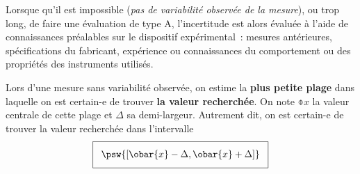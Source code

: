 \documentclass[../../main/main.tex]{subfiles}
\begin{document}
Lorsque qu'il est impossible (\textit{pas de variabilité observée de la
	mesure}), ou trop long, de faire une évaluation de type A, l'incertitude est
alors évaluée à l'aide de connaissances préalables sur le dispositif
expérimental~: mesures antérieures, spécifications du fabricant, expérience ou
connaissances du comportement ou des propriétés des instruments utilisés.
\bigbreak
\noindent
\begin{minipage}[c]{.55\linewidth}
	Lors d’une mesure sans variabilité observée, on estime la \textbf{plus petite
		plage} dans laquelle on est certain-e de trouver \textbf{la valeur recherchée}.
	On note $\obar{x}$ la valeur centrale de cette plage et $\Delta$ sa
	demi-largeur.
	\smallbreak
	Autrement dit, on est certain-e de trouver la valeur recherchée dans
	l’intervalle
	\[
		\setlength{\fboxsep}{3mm}
		\boxed{%
			\psw{%
				[\obar{x} - \Delta, \obar{x} + \Delta]
			}%
		}
	\]
	\vspace{-15pt}
\end{minipage}
\hfill
\begin{minipage}[c]{.45\linewidth}
	\begin{center}
		\label{fig:typeB}
	\end{center}
\end{minipage}
\end{document}
